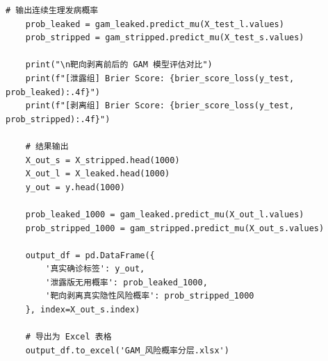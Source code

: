 \documentclass[12pt]{article}
\begin{document}
\begin{lstlisting}[caption={GAM靶向剥离标签泄露高血脂风险预测}, label={code:gam_leakage_stripping}]
	# 输出连续生理发病概率
	prob_leaked = gam_leaked.predict_mu(X_test_l.values)
	prob_stripped = gam_stripped.predict_mu(X_test_s.values)
	
	print("\n靶向剥离前后的 GAM 模型评估对比")
	print(f"[泄露组] Brier Score: {brier_score_loss(y_test, prob_leaked):.4f}")
	print(f"[剥离组] Brier Score: {brier_score_loss(y_test, prob_stripped):.4f}")
	
	# 结果输出
	X_out_s = X_stripped.head(1000)
	X_out_l = X_leaked.head(1000)
	y_out = y.head(1000)
	
	prob_leaked_1000 = gam_leaked.predict_mu(X_out_l.values)
	prob_stripped_1000 = gam_stripped.predict_mu(X_out_s.values)
	
	output_df = pd.DataFrame({
		'真实确诊标签': y_out,
		'泄露版无用概率': prob_leaked_1000,
		'靶向剥离真实隐性风险概率': prob_stripped_1000
	}, index=X_out_s.index)
	
	# 导出为 Excel 表格
	output_df.to_excel('GAM_风险概率分层.xlsx')
\end{lstlisting}
\end{document}
